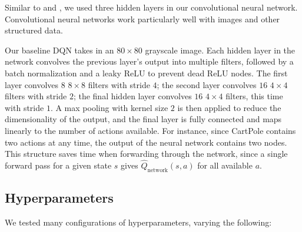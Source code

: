 \documentclass[11pt, twocolumn]{article}
\begin{document}
Similar to \cite{mnih2013playing} and \cite{mnih2015human}, we used
three hidden layers in our convolutional neural network. Convolutional
neural networks work particularly well with images and other
structured data.

Our baseline DQN takes in an $80 \times 80$ grayscale image. Each
hidden layer in the network convolves the previous layer's output into
multiple filters, followed by a batch normalization and a leaky ReLU
to prevent dead ReLU nodes. The first layer convolves $8$ $8 \times 8$
filters with stride $4$; the second layer convolves $16$ $4 \times 4$
filters with stride $2$; the final hidden layer convolves $16$ $4
\times 4$ filters, this time with stride $1$. A max pooling with
kernel size $2$ is then applied to reduce the dimensionality of the
output, and the final layer is fully connected and maps linearly to
the number of actions available. For instance, since CartPole contains
two actions at any time, the output of the neural network contains two
nodes. This structure saves time when forwarding through the network,
since a single forward pass for a given state $s$ gives
$\hat{Q}_\text{network}(s, a)$ for all available $a$.

\subsection{Hyperparameters}

We tested many configurations of hyperparameters, varying the
following:
\end{document}
